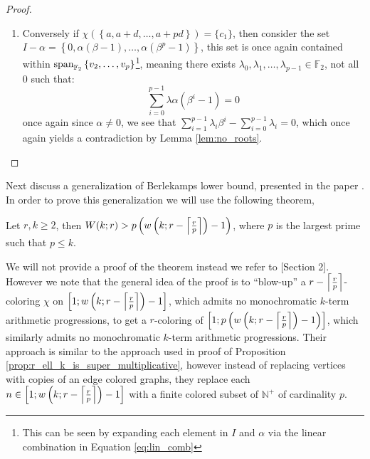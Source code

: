 \begin{proof}
\begin{enumerate}
		\item Conversely if $\chi\left(\left\{a, a + d, \ldots, a + pd\right\}\right) = \{c_{1}\}$, then consider the set $I - \alpha = \left\{0, \alpha(\beta - 1), \ldots, \alpha(\beta^p - 1)\right\}$, this set is once again contained within $\textnormal{span}_{\mathbb{F}_2} \left\{v_2, \ldots, v_p\right\}$\footnote{This can be seen by expanding each element in $I$ and $\alpha$ via the linear combination in Equation \eqref{eq:lin_comb}}, meaning there exists $\lambda_0, \lambda_1, \ldots, \lambda_{p - 1} \in \mathbb{F}_2$, not all $0$ such that:
		      \begin{equation*}
			      \sum_{i = 0}^{p - 1} \lambda \alpha (\beta^i - 1) = 0
		      \end{equation*}
		      once again since $\alpha \neq 0$, we see that $\sum_{i = 1}^{p - 1} \lambda_i \beta^{i} - \sum_{i = 0}^{p - 1} \lambda_{i} = 0$, which once again yields a contradiction by Lemma \ref{lem:no_roots}. \qedhere
	\end{enumerate}
\end{proof}

Next discuss a generalization of Berlekamps lower bound, presented in the paper \cite{van_der_waerden_lower_bound}. In order to prove this generalization we will use the following theorem,
\begin{theorem}\label{thm:from_paper}
	Let $r, k \geq 2$, then $W(k; r) > p \left(w \left(k; r - \left\lceil\frac{r}{p}\right\rceil\right) - 1\right)$, where $p$ is the largest prime such that $p \leq k$.
\end{theorem}
We will not provide a proof of the theorem instead we refer to \cite{van_der_waerden_lower_bound}[Section 2]. However we note that the general idea of the proof is to ``blow-up'' a $r - \left\lceil\frac{r}{p}\right\rceil$-coloring $\chi$ on $\left[1; w \left(k; r - \left\lceil\frac{r}{p}\right\rceil\right) - 1\right]$, which admits no monochromatic $k$-term arithmetic progressions, to get a $r$-coloring of $\left[1; p \left(w \left(k; r - \left\lceil\frac{r}{p}\right\rceil\right) - 1\right) \right]$, which similarly admits no monochromatic $k$-term arithmetic progressions. Their approach is similar to the approach used in proof of Proposition \ref{prop:r_ell_k_is_super_multiplicative}, however instead of replacing vertices with copies of an edge colored graphs, they replace each $n \in \left[1; w \left(k; r - \left\lceil\frac{r}{p}\right\rceil\right) - 1\right]$ with a finite colored subset of $\mathbb{N}^{+}$ of cardinality $p$.

